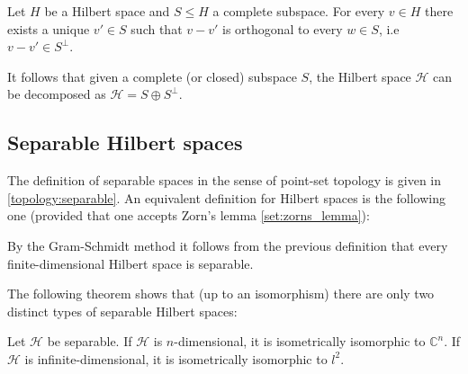    \begin{theorem}\label{functional:projection_theorem}
        Let $H$ be a Hilbert space and $S\leq H$ a complete subspace. For every $v\in H$ there exists a unique $v'\in S$ such that $v-v'$ is orthogonal to every $w\in S$, i.e $v-v'\in S^\perp$.
    \end{theorem}
    \begin{result}
        It follows that given a complete (or closed) subspace $S$, the Hilbert space $\mathcal{H}$ can be decomposed as $\mathcal{H} = S\oplus S^\perp$.
    \end{result}


\subsection{Separable Hilbert spaces}

    The definition of separable spaces in the sense of point-set topology is given in \ref{topology:separable}. An equivalent definition for Hilbert spaces is the following one (provided that one accepts Zorn's lemma \ref{set:zorns_lemma}):
    \begin{result}
        By the Gram-Schmidt method it follows from the previous definition that every finite-dimensional Hilbert space is separable.
    \end{result}

    The following theorem shows that (up to an isomorphism) there are only two distinct types of separable Hilbert spaces:
    \begin{theorem}
        Let $\mathcal{H}$ be separable. If $\mathcal{H}$ is $n$-dimensional, it is isometrically isomorphic to $\mathbb{C}^n$. If $\mathcal{H}$ is infinite-dimensional, it is isometrically isomorphic to $l^2$.
    \end{theorem}

